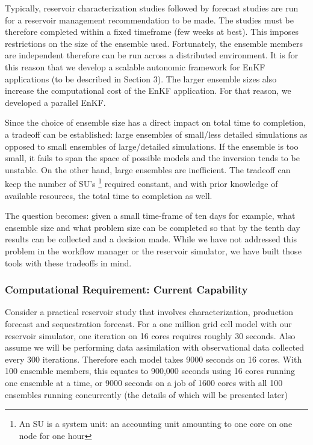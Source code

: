 \documentclass{acm_proc_article-sp}
\newcommand{\up}{\vspace*{-0.3em}}
\begin{document}
Typically, reservoir characterization studies followed by forecast
studies are run for a reservoir management recommendation to be
made. The studies must be therefore completed within a fixed timeframe
(few weeks at best). This imposes restrictions on the size of the
ensemble used. Fortunately, the ensemble members are independent
therefore can be run across a distributed environment. It is for this
reason that we develop a scalable autonomic framework for EnKF
applications (to be described in Section 3). The larger ensemble sizes
also increase the computational cost of the EnKF application. For that
reason, we developed a parallel EnKF.

Since the choice of ensemble size has a direct impact on total time to
completion, a tradeoff can be established: large ensembles of
small/less detailed simulations as opposed to small ensembles of
large/detailed simulations. If the ensemble is too small, it fails to
span the space of possible models and the inversion tends to
be unstable. On the other hand, large ensembles are
inefficient. The tradeoff can keep the number of SU's
\footnote{An SU is a system unit: an accounting unit
amounting to one core on one node for one hour} required
constant, and with prior knowledge of available resources, the total
time to completion as well.

The question becomes: given a small
time-frame of ten days for example, what ensemble size and what
problem size can be completed so that by the tenth day results can be
collected and a decision made. While we have not addressed this
problem in the workflow manager or the reservoir simulator, we have
built those tools with these tradeoffs in mind.

\up\up\up\up
\subsubsection{Computational Requirement: Current Capability}

Consider a practical reservoir study that involves characterization,
production forecast and sequestration forecast. For a one million grid
cell model with our reservoir simulator, one iteration on 16 cores
requires roughly 30 seconds. Also assume we will be performing data
assimilation with observational data collected every 300 iterations.
Therefore each model takes 9000 seconds on 16 cores. With 100 ensemble
members, this equates to 900,000 seconds using 16 cores running one
ensemble at a time, or 9000 seconds on a job of 1600 cores with all 100
ensembles running concurrently (the details of which will be presented
later)
\end{document}
